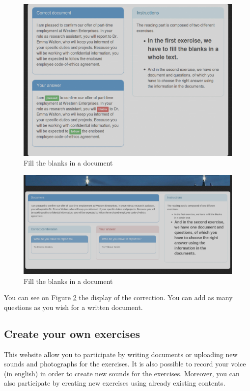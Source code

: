 \documentclass[12pt,a4paper]{report}
\begin{document}
\begin{figure}[here]
\includegraphics[scale=0.45]{rex1end.png}
\caption{Fill the blanks in a document}
\label{reading.ex1.end}
\end{figure}



\begin{figure}[here]
\includegraphics[scale=0.4]{rex2end.png}
\caption{Fill the blanks in a document}
\label{reading.ex2.end}
\end{figure}

You can see on Figure \ref{reading.ex2.end} the display of the correction. You
can add as many questions as you wish for a written document.


\subsection{Create your own exercises}

This website allow you to participate by writing documents or uploading new
sounds and photographs for the exercises. It is also possible to record your
voice (in english) in order to create new sounds for the exercises. Moreover,
you can also participate by creating new exercises using already existing
contents.
\end{document}
